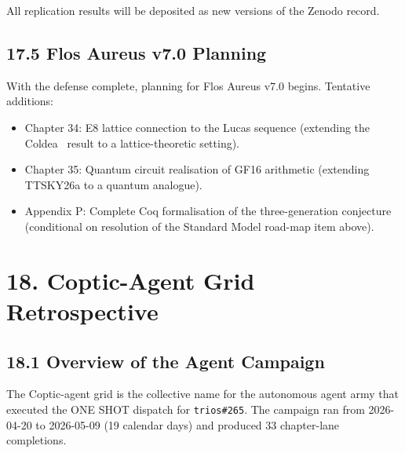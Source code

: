 All replication results will be deposited as new versions of the Zenodo
record.

\subsection{17.5 Flos Aureus v7.0 Planning}\label{sec:roadmap-v7}

With the defense complete, planning for Flos Aureus v7.0 begins.
Tentative additions:
\begin{itemize}
\item Chapter 34: E8 lattice connection to the Lucas sequence (extending
  the Coldea~\cite{coldea2010} result to a lattice-theoretic setting).
\item Chapter 35: Quantum circuit realisation of GF16 arithmetic
  (extending TTSKY26a to a quantum analogue).
\item Appendix P: Complete Coq formalisation of the three-generation
  conjecture (conditional on resolution of the Standard Model road-map
  item above).
\end{itemize}


\section{18. Coptic-Agent Grid Retrospective}\label{sec:coptic-retro}

\subsection{18.1 Overview of the Agent Campaign}\label{sec:coptic-overview}

The Coptic-agent grid is the collective name for the autonomous agent
army that executed the ONE SHOT dispatch for \texttt{trios\#265}.  The
campaign ran from 2026-04-20 to 2026-05-09 (19 calendar days) and
produced 33 chapter-lane completions.

